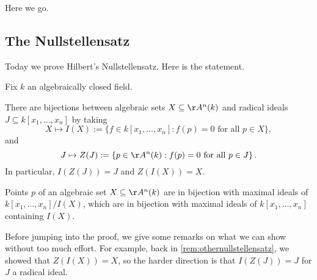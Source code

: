 \documentclass[../notes.tex]{subfiles}
\begin{document}

Here we go.

\subsection{The Nullstellensatz}
Today we prove Hilbert's Nullstellensatz. Here is the statement.
\begin{theorem}[Nullstellensatz] \label{thm:nullstellensatz}
	Fix $k$ an algebraically closed field.
	\begin{listalph}
		\item There are bijections between algebraic sets $X\subseteq\AA^n(k)$ and radical ideals $J\subseteq k[x_1,\ldots,x_n]$ by taking
		\[X\mapsto I(X):=\{f\in k[x_1,\ldots,x_n]:f(p)=0\text{ for all }p\in X\},\]
		and
		\[J\mapsto Z(J):=\left\{p\in\AA^n(k):f(p)=0\text{ for all }p\in J\right\}.\]
		In particular, $I(Z(J))=J$ and $Z(I(X))=X$.
		\item Points $p$ of an algebraic set $X\subseteq\AA^n(k)$ are in bijection with maximal ideals of $k[x_1,\ldots,x_n]/I(X)$, which are in bijection with maximal ideals of $k[x_1,\ldots,x_n]$ containing $I(X)$.
	\end{listalph}
\end{theorem}
Before jumping into the proof, we give some remarks on what we can show without too much effort. For example, back in \autoref{rem:othernullstellensatz}, we showed that $Z(I(X))=X$, so the harder direction is that $I(Z(J))=J$ for $J$ a radical ideal.
\end{document}
